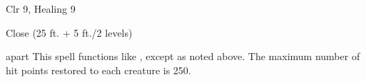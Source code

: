 
\begin{description*}
\item[Level:] Clr 9, Healing 9
\item[Range:] Close (25 ft. + 5 ft./2 levels)
\end{description*}

apart
This spell functions like , except as noted above. The maximum number
of hit points restored to each creature is 250.